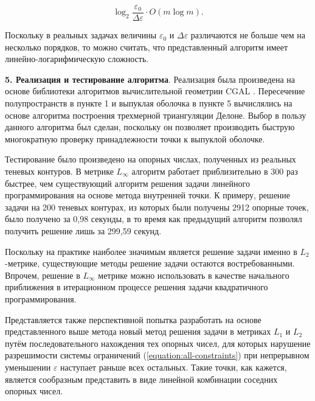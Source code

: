 \documentclass[a4paper, 10pt]{article}
\theoremstyle{definition}
\theoremstyle{plain}
\theoremstyle{plain}
\begin{document}
\begin{equation*}
 \log_{2} \frac{\varepsilon_{0}}{\Delta \varepsilon} \cdot O(m \log m).
\end{equation*}

Поскольку в реальных задачах величины $\varepsilon_{0}$ и
$\Delta \varepsilon$ различаются не больше чем на несколько порядков, то
можно считать, что представленный алгоритм имеет линейно-логарифмическую
сложность.

\textbf{5. Реализация и тестирование алгоритма}.
Реализация была произведена на основе библиотеки алгоритмов вычислительной
геометрии CGAL \cite{cgal}. Пересечение полупространств в пункте 1 и выпуклая
оболочка в пункте 5 вычислялись на основе алгоритма построения трехмерной
триангуляции Делоне. Выбор в пользу данного алгоритма был сделан, поскольку он
позволяет производить быструю многократную проверку принадлежности точки к
выпуклой оболочке.

Тестирование было произведено на опорных числах, полученных из реальных
теневых контуров. В метрике $L_{\infty}$ алгоритм работает приблизительно в 300
раз быстрее, чем существующий алгоритм решения задачи линейного программирования
на основе метода внутренней точки. К примеру, решение задачи на 200 теневых
контурах, из которых были получены 2912 опорные точек, было получено за 0,98
секунды, в то время как предыдущий алгоритм позволял получить решение лишь за
299,59 секунд.

Поскольку на практике наиболее значимым является решение задачи именно в
$L_{2}$-метрике, существующие методы решение задачи остаются востребованными.
Впрочем, решение в $L_{\infty}$ метрике можно использовать в качестве начального
приближения в итерационном процессе решения задачи квадратичного
программирования.

Представляется также перспективной попытка разработать на основе представленного
выше метода новый метод решения задачи в метриках $L_{1}$ и $L_{2}$ путём
последовательного нахождения тех опорных чисел, для которых нарушение
разрешимости системы ограничений (\ref{equation:all-constraints}) при
непрерывном уменьшении $\varepsilon$ наступает раньше всех остальных. Такие
точки, как кажется, является сообразным представить в виде линейной
комбинации соседних опорных чисел.
\end{document}
